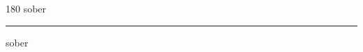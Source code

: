 
\begin{frame}
\begin{center}
\begin{turn}{180}
{\fontsize{2.5cm}{1em}\selectfont sober}
\end{turn}
\vspace{1em}\par  
\hrule
\vspace{1em}\par  
{\fontsize{2.5cm}{1em}\selectfont sober}
\end{center}
\end{frame}
